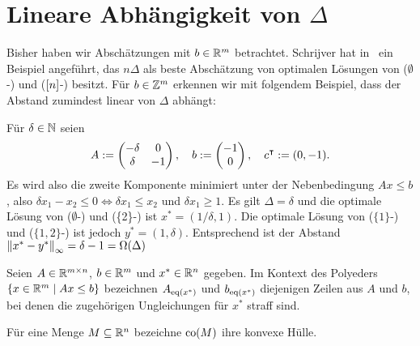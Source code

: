 

\section{Lineare Abhängigkeit von $\Delta$}\label{sec:linear}

Bisher haben wir Abschätzungen mit $b\in\mathbb{R}^m$ betrachtet.
Schrijver hat in~\cite[Kapitel~17.2]{Schrijver1986} ein Beispiel angeführt, das $n\Delta$ als beste Abschätzung von optimalen Lösungen von ($\emptyset$-\MIPR) und ($[n]$-\MIPR) besitzt.
Für $b\in\mathbb{Z}^m$ erkennen wir mit folgendem Beispiel, dass der Abstand zumindest linear von $\Delta$ abhängt:
\begin{example}
	Für $\delta\in\mathbb{N}$ seien
	$$A:=
	\begin{pmatrix}
	-\delta & 0  \\
	\delta  & -1
	\end{pmatrix},\quad
	b:=\begin{pmatrix} -1 \\ 0 \end{pmatrix},\quad
	c^\intercal:=(0, -1).
	$$
	Es wird also die zweite Komponente minimiert unter der Nebenbedingung $Ax\leq b$, also $\delta x_1-x_2\leq0\Leftrightarrow\delta x_1\leq x_2$ und $\delta x_1\geq 1$.
	Es gilt $\Delta=\delta$ und die optimale Lösung von ($\emptyset$-\MIPI) und (\{2\}-\MIPI) ist $x^*=(1/\delta,1)$.
	Die optimale Lösung von ($\{1\}$-\MIPI) und ($\{1, 2\}$-\MIPI) ist jedoch $y^*=(1,\delta)$.
	Entsprechend ist der Abstand $\left\lVert x^*-y^*\right\rVert_\infty=\delta-1=\Omega(\Delta)$
\end{example}

\begin{notation}
	Seien $A\in\mathbb{R}^{m\times n}$, $b\in\mathbb{R}^m$ und $x^*\in\mathbb{R}^n$ gegeben.
	Im Kontext des Polyeders $\{ x\in\mathbb{R}^m \mid Ax\leq b \}$ bezeichnen
	$A_{\operatorname{eq}(x^*)}$ und $b_{\operatorname{eq}(x^*)}$ diejenigen Zeilen aus $A$ und $b$, bei denen die zugehörigen Ungleichungen für $x^*$ straff sind.
	
	Für eine Menge $M\subseteq \mathbb{R}^n$ bezeichne $\operatorname{co}(M)$ ihre konvexe Hülle.
\end{notation}

